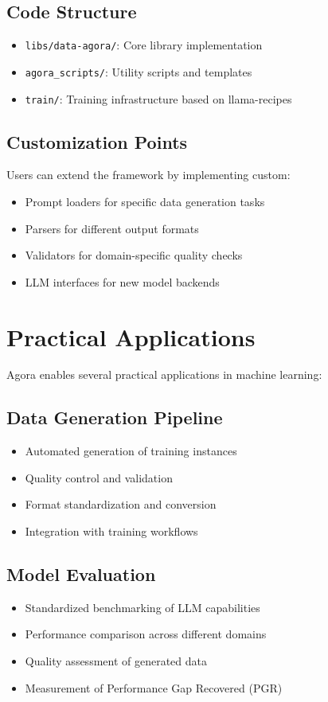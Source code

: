 \documentclass[10pt,conference]{IEEEtran}
\begin{document}
\subsection{Code Structure}
\begin{itemize}
    \item \texttt{libs/data-agora/}: Core library implementation
    \item \texttt{agora\_scripts/}: Utility scripts and templates
    \item \texttt{train/}: Training infrastructure based on llama-recipes
\end{itemize}

\subsection{Customization Points}
Users can extend the framework by implementing custom:
\begin{itemize}
    \item Prompt loaders for specific data generation tasks
    \item Parsers for different output formats
    \item Validators for domain-specific quality checks
    \item LLM interfaces for new model backends
\end{itemize}

\section{Practical Applications}
Agora enables several practical applications in machine learning:

\subsection{Data Generation Pipeline}
\begin{itemize}
    \item Automated generation of training instances
    \item Quality control and validation
    \item Format standardization and conversion
    \item Integration with training workflows
\end{itemize}

\subsection{Model Evaluation}
\begin{itemize}
    \item Standardized benchmarking of LLM capabilities
    \item Performance comparison across different domains
    \item Quality assessment of generated data
    \item Measurement of Performance Gap Recovered (PGR)
\end{itemize}
\end{document}
